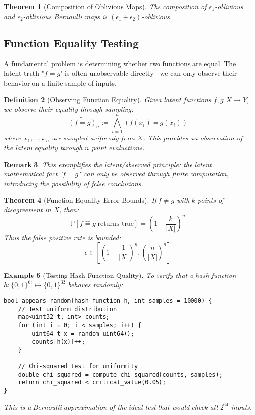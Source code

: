 \documentclass[11pt,final,hidelinks]{article}
\newtheorem{theorem}{Theorem}[section]
\newtheorem{definition}[theorem]{Definition}
\newtheorem{example}[theorem]{Example}
\newtheorem{remark}[theorem]{Remark}
\newcommand{\obs}[1]{\widetilde{#1}}  %
\newcommand{\Set}[1]{#1}              %
\newcommand{\Prob}[1]{\mathbb{P}\left[#1\right]}
\begin{document}
\begin{theorem}[Composition of Oblivious Maps]
The composition of $\epsilon_1$-oblivious and $\epsilon_2$-oblivious Bernoulli maps is $(\epsilon_1 + \epsilon_2)$-oblivious.
\end{theorem}

\subsection{Function Equality Testing}

A fundamental problem is determining whether two functions are equal. The latent truth "$f = g$" is often unobservable directly—we can only observe their behavior on a finite sample of inputs.

\begin{definition}[Observing Function Equality]
Given latent functions $f, g : X \to Y$, we observe their equality through sampling:
\begin{equation}
\obs{(f = g)}_n := \bigwedge_{i=1}^n (f(x_i) = g(x_i))
\end{equation}
where $x_1, \ldots, x_n$ are sampled uniformly from $X$. This provides an observation of the latent equality through $n$ point evaluations.
\end{definition}

\begin{remark}
This exemplifies the latent/observed principle: the latent mathematical fact "$f = g$" can only be observed through finite computation, introducing the possibility of false conclusions.
\end{remark}

\begin{theorem}[Function Equality Error Bounds]
If $f \neq g$ with $k$ points of disagreement in $\Set{X}$, then:
\begin{equation}
\Prob{f \hat{=} g \text{ returns true}} = \left(1 - \frac{k}{|\Set{X}|}\right)^n
\end{equation}
Thus the false positive rate is bounded:
\begin{equation}
\epsilon \in \left[\left(1 - \frac{1}{|\Set{X}|}\right)^n, \left(\frac{n}{|\Set{X}|}\right)^n\right]
\end{equation}
\end{theorem}

\begin{example}[Testing Hash Function Quality]
To verify that a hash function $h : \{0,1\}^{64} \mapsto \{0,1\}^{32}$ behaves randomly:
\begin{verbatim}
bool appears_random(hash_function h, int samples = 10000) {
    // Test uniform distribution
    map<uint32_t, int> counts;
    for (int i = 0; i < samples; i++) {
        uint64_t x = random_uint64();
        counts[h(x)]++;
    }
    
    // Chi-squared test for uniformity
    double chi_squared = compute_chi_squared(counts, samples);
    return chi_squared < critical_value(0.05);
}
\end{verbatim}

This is a Bernoulli approximation of the ideal test that would check all $2^{64}$ inputs.
\end{example}
\end{document}
